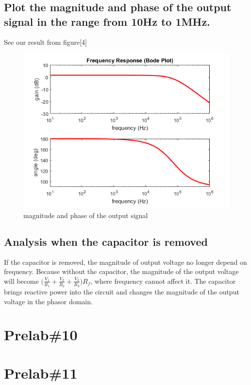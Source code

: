\documentclass{IEEEtran}
\begin{document}
	\subsection{Plot the magnitude and phase of the output signal in the range from 10Hz to 1MHz.}
	See our result from figure[4]\\
	\begin{figure}
		\centering
		\label{fig:901}
		\begin{framed}
			\includegraphics[width=\linewidth]{images/9_1.PNG}
			\caption{magnitude and phase of the output signal}
		\end{framed}
	\end{figure}
	\subsection{Analysis when the capacitor is removed}
	If the capacitor is removed, the magnitude of output voltage no longer depend on frequency. Because without 
	the capacitor, the magnitude of the output voltage will become $\bigg(\frac{V_1}{R_1} + \frac{V_2}{R_2} + \frac{V_3}{R_3}\bigg)R_f$, where frequency cannot affect it. The capacitor brings reactive power into the circuit and changes the magnitude of the output voltage in the phasor domain.
	\section{\textbf{Prelab\#10}}
	\section{\textbf{Prelab\#11}}
\end{document}
